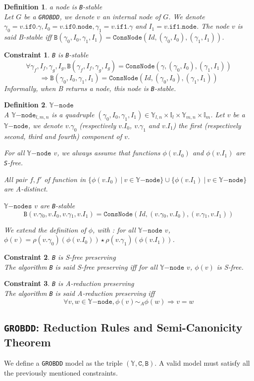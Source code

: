 \documentclass[a4paper,10pt]{article}
\newcommand{\Y}{\mathbb{Y}}
\newcommand{\I}{\mathbb{I}}
\newcommand{\Ynode}{\Y\mathtt{-node}}
\newcommand{\Ynodes}{\Y\mathtt{-nodes}}
\newcommand{\GroBdd}{\texttt{GROBDD}}
\newcommand{\fieldNode}{\texttt{node}}
\newcommand{\fieldGamma}{\mathtt{\gamma}}
\newcommand{\fieldThen}{\mathtt{if1}}
\newcommand{\fieldElse}{\mathtt{if0}}
\newtheorem{newdef}{Definition}
\newcommand{\definition}[2]{\begin{newdef}{#1\\}#2\end{newdef}}
\newtheorem{newcons}{Constraint}
\newcommand{\constraint}[2]{\begin{newcons}{#1\\}#2\end{newcons}}
\begin{document}
\definition{a node is \texttt{B}-stable}
{Let $G$ be a \GroBdd{}, we denote $v$ an internal node of $G$.
We denote $\gamma_0 = v.\fieldElse{}.\fieldGamma{}, I_0 = v.\fieldElse{}.\fieldNode{}, \gamma_1 = v.\fieldThen{}.\fieldGamma{}$ and $I_1 = v.\fieldThen{}.\fieldNode{}$.
The node $v$ is said B-stable iff $\mathtt{B}(\gamma_0, I_0, \gamma_1, I_1) = \mathtt{ConsNode}(Id, (\gamma_0, I_0), (\gamma_1, I_1))$.
}

\constraint{\texttt{B} is \texttt{B}-stable}
{\[\forall \gamma_f, I_f, \gamma_g, I_g, \mathtt{B}(\gamma_f, I_f, \gamma_g, I_g) = \mathtt{ConsNode}(\gamma, (\gamma_0, I_0), (\gamma_1, I_1))\]
\[\Rightarrow \mathtt{B}(\gamma_0, I_0, \gamma_1, I_1) = \mathtt{ConsNode}(Id, (\gamma_0, I_0), (\gamma_1, I_1))\]
Informally, when B returns a node, this node is \texttt{B}-stable.
}

\definition{$\Ynode$}
{A $\Ynode_{l, m, n}$ is a quadruple $(\gamma_0, I_0, \gamma_1, I_1) \in \Y_{l, n} \times \I_l \times \Y_{m, n} \times \I_m$. Let $v$ be a $\Ynode$, we denote $v.\gamma_0$ (respectively $v.I_0$, $v.\gamma_1$ and $v.I_1$) the first (respectively second, third and fourth) component of $v$.
\begin{compactenum}
\item For all $\Ynode$ $v$, we always assume that functions $\phi(v.I_0)$ and $\phi(v.I_1)$ are \texttt{S}-free.
\item All pair $f, f'$ of function in $\{\phi(v.I_0) ~|~ v \in\Ynode\} \cup \{\phi(v.I_1) ~|~ v\in\Ynode\}$ are A-distinct.
\item  $\Ynodes$ $v$ are \texttt{B}-stable
\[\mathtt{B}(v.\fieldGamma{}_0, v.I_0, v.\fieldGamma{}_1, v.I_1) = \mathtt{ConsNode}(Id, (v.\fieldGamma{}_0, v.I_0), (v.\fieldGamma{}_1, v.I_1))\]
\end{compactenum}
We extend the definition of $\phi$, with : for all $\Ynode$ $v$, $\phi(v) = \rho(v.\gamma_0)(\phi(v.I_0)) \star \rho(v.\gamma_1)(\phi(v.I_1))$.
}
\constraint{\texttt{B} is S-free preserving}
{The algorithm \texttt{B} is said S-free preserving iff for all $\Ynode$ $v$, $\phi(v)$ is S-free.}

\constraint{\texttt{B} is A-reduction preserving}
{The algorithm \texttt{B} is said A-reduction preserving iff
\[\forall v, w \in\Ynode, \phi(v) \sim_A \phi(w) \Rightarrow v = w\]}

\subsection{\GroBdd{}: Reduction Rules and Semi-Canonicity Theorem\label{grobdd-reduction}}
We define a \GroBdd{} model as the triple $(\Y, \mathtt{C}, \mathtt{B})$.
A valid model must satisfy all the previously mentioned constraints.
\end{document}
